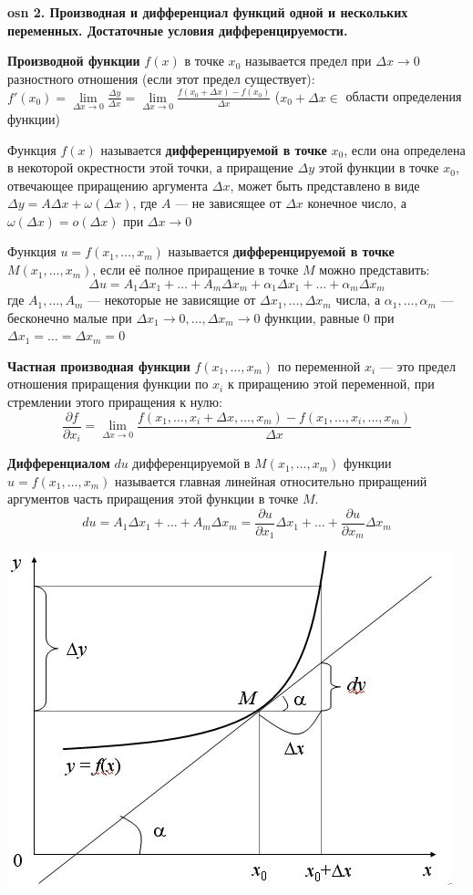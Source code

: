 \textbf{\LARGE osn 2. Производная и дифференциал функций одной и нескольких переменных. Достаточные условия дифференцируемости.}

\textbf{Производной функции} $f(x)$ в точке $x_0$ называется предел при $\Delta x \to 0$ разностного отношения (если этот предел существует): $f'(x_0) = \lim \limits_{\Delta x \to 0}\frac{\Delta y}{\Delta x} = \lim \limits_{\Delta x \to 0} \frac{f(x_0+\Delta x)-f(x_0)}{\Delta x}$ ($x_0 + \Delta x \in$ области определения функции)

\bigbreak
Функция $f(x)$ называется \textbf{дифференцируемой в точке} $x_0$, если она определена в некоторой окрестности этой точки, а приращение $\Delta y$ этой функции в точке $x_0$, отвечающее приращению аргумента $\Delta x$, может быть представлено в виде $\Delta y = A \Delta x+ \omega(\Delta x)$, где $A$ --- не зависящее от $\Delta x$ конечное число, а $\omega(\Delta x) = o(\Delta x)$ при $\Delta x \to 0$

\bigbreak
Функция $u = f(x_1,\dots,x_m)$ называется \textbf{дифференцируемой в точке $M(x_1,\dots,x_m)$}, если её полное приращение в точке $M$ можно представить: 
$$ \Delta u= A_1 \Delta x_1 +\dots+A_m \Delta x_m + \alpha_1 \Delta x_1 +\dots+ \alpha_m \Delta x_m $$
где $A_1, \dots, A_m$ --- некоторые не зависящие от $\Delta x_1, \dots, \Delta x_m$ числа, а $ \alpha_1, \dots, \alpha_m$ --- бесконечно малые при $\Delta x_1 \to 0, \dots, \Delta x_m \to 0$ функции, равные 0 при $\Delta x_1 = \dots = \Delta x_m = 0$

\bigbreak
\textbf{Частная производная функции} $f(x_1,\dots,x_m)$ по переменной $x_i$ --- это предел отношения приращения функции по $x_i$ к приращению этой переменной, при стремлении этого приращения к нулю: $$ \frac{\partial f}{\partial x_i} = \lim\limits_{\Delta x \to 0}\frac{ f(x_1,\dots,x_i +\Delta x,\dots,x_m)-f(x_1,\dots,x_i,\dots,x_m)}{\Delta x}$$

\bigbreak
\textbf{Дифференциалом} $du$ дифференцируемой в $M(x_1,\dots,x_m)$ функции $u = f(x_1,\dots,x_m)$ называется главная линейная относительно приращений аргументов часть приращения этой функции в точке $M.$
$$du=A_1\Delta x_1 +\dots+A_m \Delta x_m = \frac{\partial u}{\partial x_1}\Delta x_1 +\dots+ \frac{\partial u}{\partial x_m}\Delta x_m$$

\includegraphics[scale=0.65]{pics/osn02_derivative.jpg}


